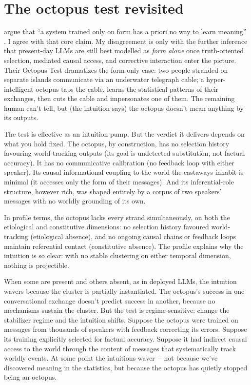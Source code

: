 \documentclass[12pt]{article}
\begin{document}
\section{The octopus test revisited}
\label{sec:octopus}

\textcite{bender_koller_2020_climbing_towards_nlu} argue that \enquote{a system trained only on form has a priori no way to learn meaning} \citep[1]{bender_koller_2020_climbing_towards_nlu}. I agree with that core claim. My disagreement is only with the further inference that present-day LLMs are still best modelled as \emph{form alone} once truth-oriented selection, mediated causal access, and corrective interaction enter the picture. Their Octopus Test dramatizes the form-only case: two people stranded on separate islands communicate via an underwater telegraph cable; a hyper-intelligent octopus taps the cable, learns the statistical patterns of their exchanges, then cuts the cable and impersonates one of them. The remaining human can't tell, but (the intuition says) the octopus doesn't mean anything by its outputs.

The test is effective as an intuition pump. But the verdict it delivers depends on what you hold fixed. The octopus, by construction, has no selection history favouring world-tracking outputs (its goal is undetected substitution, not factual accuracy). It has no communicative calibration (no feedback loop with either speaker). Its causal-informational coupling to the world the castaways inhabit is minimal (it accesses only the form of their messages). And its inferential-role structure, however rich, was shaped entirely by a corpus of two speakers' messages with no worldly grounding of its own.

In profile terms, the octopus lacks every strand simultaneously, on both the etiological and constitutive dimensions: no selection history favoured world-tracking (etiological absence), and no ongoing causal chains or feedback loops maintain referential contact (constitutive absence). The profile explains why the intuition is so clear: with no stable clustering on either temporal dimension, nothing is projectible.

When some are present and others absent, as in deployed LLMs, the intuition wavers because the cluster is partially instantiated. The octopus's success in one conversational exchange doesn't predict success in another, because no mechanisms sustain the cluster. But the test is regime-sensitive: change the stabilizer regime and the intuition shifts. Suppose the octopus were trained on messages from thousands of speakers with feedback correcting its errors. Suppose its training explicitly selected for factual accuracy. Suppose it had indirect causal access to the world through the content of messages that systematically track worldly events. At some point the intuitions waver~-- not because we've discovered meaning in the statistics, but because the octopus has quietly stopped being an octopus.
\end{document}
